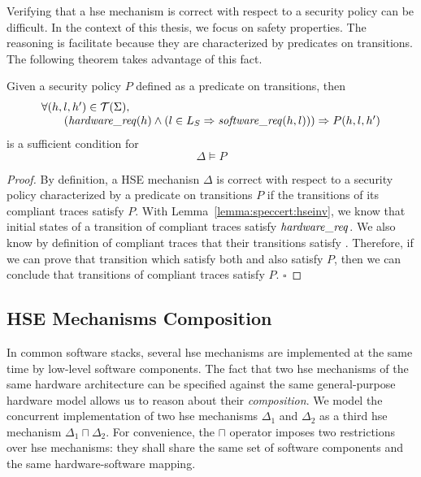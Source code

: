 Verifying that a \ac{hse} mechanism is correct with respect to a security policy
can be difficult.
%
In the context of this thesis, we focus on safety properties.
%
The reasoning is facilitate because they are characterized by predicates on
transitions.
%
The following theorem takes advantage of this fact.

\begin{theorem}
  \label{theorem:speccert:correcthse}
  Given a security policy $P$ defined as a predicate on transitions, then
  \[
    \begin{array}{l}
      \forall (h, l, h') \in \mathcal{T}(\Sigma), \\
      \qquad (\mathit{hardware\_req}(h) \wedge
      (l \in L_{S} \Rightarrow \mathit{software\_req}(h, l)))
      \Rightarrow P(h, l, h')
    \end{array}
  \]
  is a sufficient condition for
  \[
    \Delta \models P
  \]

  \begin{proof}
    By definition, a HSE mechanisn \( \Delta \) is correct with respect to a
    security policy characterized by a predicate on transitions \( P \) if the
    transitions of its compliant traces satisfy \( P \).
    With Lemma~\ref{lemma:speccert:hseinv}, we know that initial states of a
    transition of compliant traces satisfy $\mathit{hardware\_req}$.
    We also know by definition of compliant traces that their transitions
    satisfy .
    Therefore, if we can prove that transition which satisfy both
     and  also satisfy \( P \), then we
    can conclude that transitions of compliant traces satisfy \( P \).
    \hfill \( \square \)
  \end{proof}
\end{theorem}

\subsection{HSE Mechanisms Composition}
\label{subsec:speccert:compo}

In common software stacks, several \ac{hse} mechanisms are implemented at the
same time by low-level software components.
%
The fact that two \ac{hse} mechanisms of the same hardware architecture can be
specified against the same general-purpose hardware model allows us to reason
about their \emph{composition}.
%
We model the concurrent implementation of two \ac{hse} mechanisms \( \Delta_1 \)
and \( \Delta_2 \) as a third \ac{hse} mechanism \( \Delta_1 \sqcap \Delta_2 \).
%
For convenience, the \( \sqcap \) operator imposes two restrictions over
\ac{hse} mechanisms: they shall share the same set of software components and
the same hardware-software mapping.

